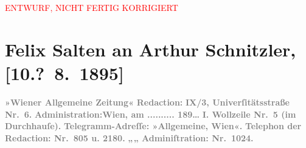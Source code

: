 
\begin{center}
            \textcolor{red}{ENTWURF, NICHT FERTIG KORRIGIERT}
                      \end{center}
            
         \renewcommand{\erwaehnteInstitutionen}{Institutionen: Wiener Allgemeine Zeitung}
         \renewcommand{\erwaehnteOrte}{Orte: Bad Ischl, Universitätsstraße, Wien, Wollzeile}
         \renewcommand{\erwaehnteWerke}{}
               \section[Felix Salten an Arthur Schnitzler, {[}10.? 8. 1895{]}]{ Felix Salten an Arthur Schnitzler, {[}10.? 8. 1895{]}}\nopagebreak{}\rehead{ }\begin{ledgroupsized}[t]{13cm}\normalsize\beginnumbering \toendnotes[C]{\smallbreak\pagebreak[2]} 
\toendnotes[C]{\smallbreak}\pstart
           \noindent{}{\pb}\textcolor{gray}{\textbf{\textbf{»Wiener Allgemeine
                        Zeitung«}}}\pend
           \pstart
           \textcolor{gray}{\textbf{Redaction:}}\pend
           \pstart
           \textcolor{gray}{\textbf{\textbf{IX/3, Univerſitätsstraße Nr. 6.}}}\pend
           \pstart
           \textcolor{gray}{\textbf{Administration:}}\hfill \textcolor{gray}{\textbf{Wien, am ..........{ }189{\dots}}}\pend
           \pstart
           \textcolor{gray}{\textbf{\textbf{I. Wollzeile Nr. 5} (im Durchhauſe).}}\pend
           \pstart
           \textcolor{gray}{\textbf{Telegramm-Adreſſe: »Allgemeine, Wien«.}}\pend
           \pstart
           \textcolor{gray}{\textbf{Telephon der Redaction: Nr. 805 u. 2180.}}\pend
           \pstart
           \textcolor{gray}{\textbf{\hspace*{2.5em}„\hspace*{2.5em}„\hspace*{2.5em} Adminiſtration: Nr. 1024.}}\pend

\end{ledgroupsized}
